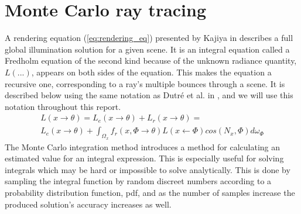 \documentclass[]{report}   %
\begin{document}
\section{Monte Carlo ray tracing}
A rendering equation (\ref{eq:rendering_eq}) presented by Kajiya in \cite{kajiya} describes a full global illumination solution for a given scene. It is an integral equation called a Fredholm equation of the second kind because of the unknown radiance quantity, $L(...)$, appears on both sides of the equation. This makes the equation a recursive one, corresponding to a ray's multiple bounces through a scene. It is described below using the same notation as Dutr\'{e} et al. in \cite{dutre}, and we will use this notation throughout this report.
\begin{equation}
\label{eq:rendering_eq}
\begin{split}
L(x \rightarrow \theta) = L_e(x \rightarrow \theta) + L_r(x \rightarrow \theta) =\\ 
L_e(x \rightarrow \theta) + \int_{\Omega_x} f_r(x, \Phi \rightarrow \theta)L(x \leftarrow \Phi)cos(N_x, \Phi)d\omega_{\Phi}
\end{split}
\end{equation}
The Monte Carlo integration method introduces a method for calculating an estimated value for an integral expression. 
This is especially useful for solving integrals which may be hard or impossible to solve analytically. 
This is done by sampling the integral function by random discreet numbers according to a probability distribution function, pdf, and as the number of samples increase the produced solution's accuracy increases as well.
\end{document}

